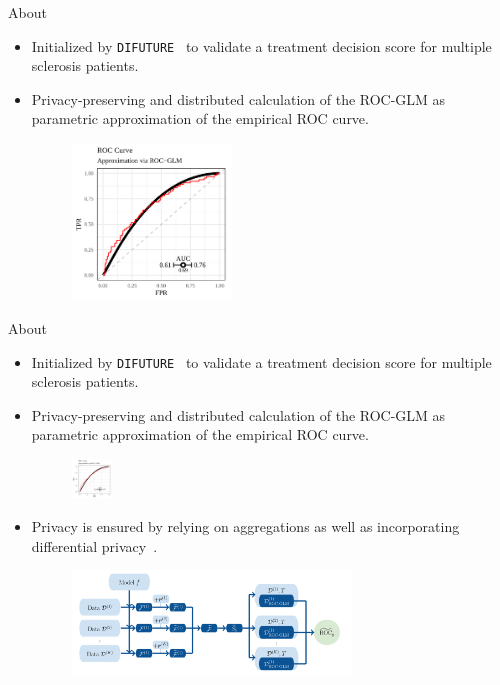 \documentclass[t,10pt]{beamer}
\begin{document}
\begin{frame}{About}
  \begin{itemize}
    \item Initialized by \texttt{DIFUTURE}~\citep{DIFUTURE2018} to validate a treatment decision score for multiple sclerosis patients.
    \item Privacy-preserving and distributed calculation of the ROC-GLM as parametric approximation of the empirical ROC curve.
      \begin{figure}
        \centering
        \includegraphics[width=0.4\textwidth]{figures/fig-dauc-appr.png}
      \end{figure}
  \end{itemize}
\end{frame}

\begin{frame}{About}
  \begin{itemize}
    \item Initialized by \texttt{DIFUTURE}~\citep{DIFUTURE2018} to validate a treatment decision score for multiple sclerosis patients.
    \item Privacy-preserving and distributed calculation of the ROC-GLM as parametric approximation of the empirical ROC curve.
      \begin{figure}
        \centering
        \includegraphics[width=0.1\textwidth]{figures/fig-dauc-appr.png}
      \end{figure}
    \item Privacy is ensured by relying on aggregations as well as incorporating differential privacy~\citep{dwork2006differential}.
      \begin{figure}
        \centering
        \includegraphics[width=0.7\textwidth]{figures/fig-dauc-algo.png}
      \end{figure}
  \end{itemize}
	\addtocounter{framenumber}{-1}
\end{frame}
\end{document}
